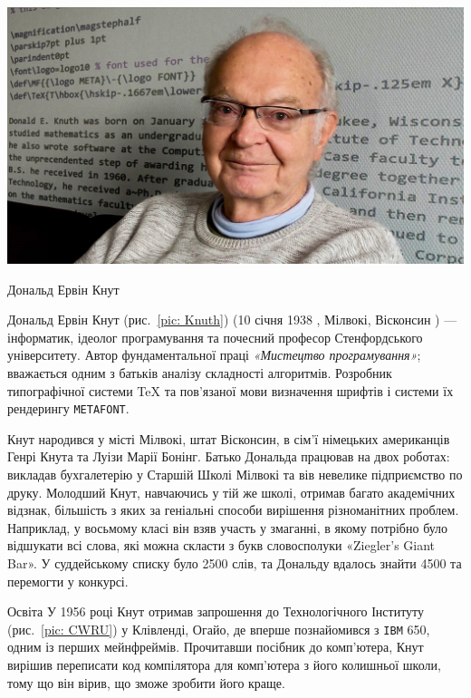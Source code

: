 \documentclass{article}
\begin{document}
\thispagestyle{empty}

\begin{wrapstuff}[type=figure, width=0.4\textwidth, l,top=4]
	\centering
	\includegraphics[width=\linewidth]{Knuth}
	\caption{Дональд Ервін Кнут}
	\label{pic: Knuth}
\end{wrapstuff}


Дональд Ервін Кнут (рис.~\ref{pic: Knuth}) (10 січня 1938 , Мілвокі, Вісконсин ) --- інформатик, ідеолог програмування та почесний професор Стенфордського університету. Автор фундаментальної праці \textit{«Мистецтво програмування»}; вважається одним з батьків аналізу складності алгоритмів. Розробник типографічної системи \TeX{} та пов'язаної мови визначення шрифтів і системи їх рендерингу \texttt{METAFONT}.

Кнут народився у місті Мілвокі, штат Вісконсин, в сім'ї німецьких американців Генрі Кнута та Луізи Марії Бонінг. Батько Дональда працював на двох роботах: викладав бухгалетерію у Старшій Школі Мілвокі та вів невелике підприємство по друку. Молодший Кнут, навчаючись у тій же школі, отримав багато академічних відзнак, більшість з яких за геніальні способи вирішення різноманітних проблем. Наприклад, у восьмому класі він взяв участь у змаганні, в якому потрібно було відшукати всі слова, які можна скласти з букв словосполуки «Ziegler's Giant Bar». У суддейському списку було 2500 слів, та Дональду вдалось знайти 4500 та перемогти у конкурсі.

Освіта У 1956 році Кнут отримав запрошення до Технологічного Інституту (рис.~\ref{pic: CWRU}) у Клівленді, Огайо, де вперше познайомився з \texttt{IBM} 650, одним із перших мейнфреймів. Прочитавши посібник до комп'ютера, Кнут вирішив переписати код компілятора для комп'ютера з його колишньої школи, тому що
він вірив, що зможе зробити його краще.
\end{document}
